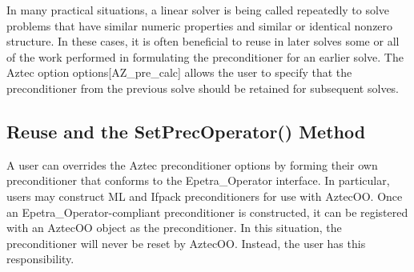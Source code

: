 \documentclass[12pt,relax]{AztecOOUserGuide}
\renewcommand{\vector}{Epetra\_Vector}
\newcommand{\distobject}{Epetra\_DistObject}
\newcommand{\operator}{Epetra\_Operator}
\begin{document}
In many practical situations, a linear solver is being called
repeatedly to solve problems that have similar numeric properties and
similar or identical nonzero structure.  In these cases, it is often
beneficial to reuse in later solves some or all of the work performed
in formulating the preconditioner for an earlier solve.  The Aztec
option options[{\sf AZ\_pre\_calc}] allows the user to specify that the
preconditioner from the previous solve should be retained for
subsequent solves.  

\subsection{Reuse and the SetPrecOperator() Method}

A user can overrides the Aztec preconditioner options by
forming their own preconditioner that conforms to the \operator{}
interface.  In particular, users may construct ML and Ifpack
preconditioners for use with AztecOO.  Once an \operator{}-compliant
preconditioner is constructed, it can be registered with an AztecOO
object as the preconditioner.  In this situation, the preconditioner
will never be reset by AztecOO.  Instead, the user has this responsibility.

\clearpage



\end{document}

